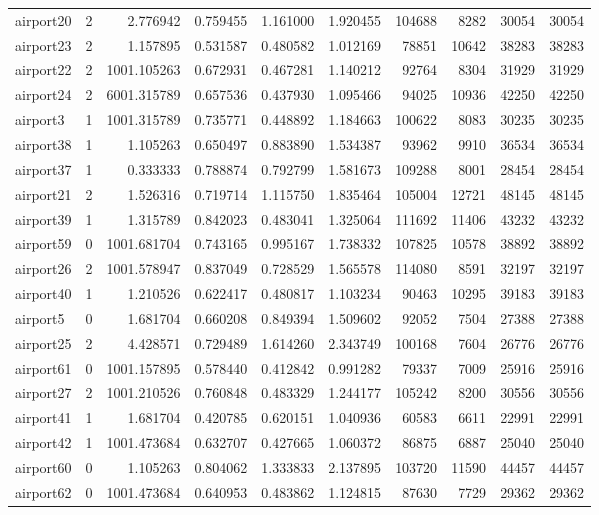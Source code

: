 \documentclass[../../../thesis.tex]{subfiles}
\begin{document}
\begin{longtable}{|l|r|r|r|r|r|r|r|r|r|}
airport20 & 2 & 2.776942 & 0.759455 & 1.161000 & 1.920455 & 104688 & 8282 & 30054 & 30054 \\
airport23 & 2 & 1.157895 & 0.531587 & 0.480582 & 1.012169 & 78851 & 10642 & 38283 & 38283 \\
airport22 & 2 & 1001.105263 & 0.672931 & 0.467281 & 1.140212 & 92764 & 8304 & 31929 & 31929 \\
airport24 & 2 & 6001.315789 & 0.657536 & 0.437930 & 1.095466 & 94025 & 10936 & 42250 & 42250 \\
airport3 & 1 & 1001.315789 & 0.735771 & 0.448892 & 1.184663 & 100622 & 8083 & 30235 & 30235 \\
airport38 & 1 & 1.105263 & 0.650497 & 0.883890 & 1.534387 & 93962 & 9910 & 36534 & 36534 \\
airport37 & 1 & 0.333333 & 0.788874 & 0.792799 & 1.581673 & 109288 & 8001 & 28454 & 28454 \\
airport21 & 2 & 1.526316 & 0.719714 & 1.115750 & 1.835464 & 105004 & 12721 & 48145 & 48145 \\
airport39 & 1 & 1.315789 & 0.842023 & 0.483041 & 1.325064 & 111692 & 11406 & 43232 & 43232 \\
airport59 & 0 & 1001.681704 & 0.743165 & 0.995167 & 1.738332 & 107825 & 10578 & 38892 & 38892 \\
airport26 & 2 & 1001.578947 & 0.837049 & 0.728529 & 1.565578 & 114080 & 8591 & 32197 & 32197 \\
airport40 & 1 & 1.210526 & 0.622417 & 0.480817 & 1.103234 & 90463 & 10295 & 39183 & 39183 \\
airport5 & 0 & 1.681704 & 0.660208 & 0.849394 & 1.509602 & 92052 & 7504 & 27388 & 27388 \\
airport25 & 2 & 4.428571 & 0.729489 & 1.614260 & 2.343749 & 100168 & 7604 & 26776 & 26776 \\
airport61 & 0 & 1001.157895 & 0.578440 & 0.412842 & 0.991282 & 79337 & 7009 & 25916 & 25916 \\
airport27 & 2 & 1001.210526 & 0.760848 & 0.483329 & 1.244177 & 105242 & 8200 & 30556 & 30556 \\
airport41 & 1 & 1.681704 & 0.420785 & 0.620151 & 1.040936 & 60583 & 6611 & 22991 & 22991 \\
airport42 & 1 & 1001.473684 & 0.632707 & 0.427665 & 1.060372 & 86875 & 6887 & 25040 & 25040 \\
airport60 & 0 & 1.105263 & 0.804062 & 1.333833 & 2.137895 & 103720 & 11590 & 44457 & 44457 \\
airport62 & 0 & 1001.473684 & 0.640953 & 0.483862 & 1.124815 & 87630 & 7729 & 29362 & 29362 \\

\end{longtable}
\end{document}
